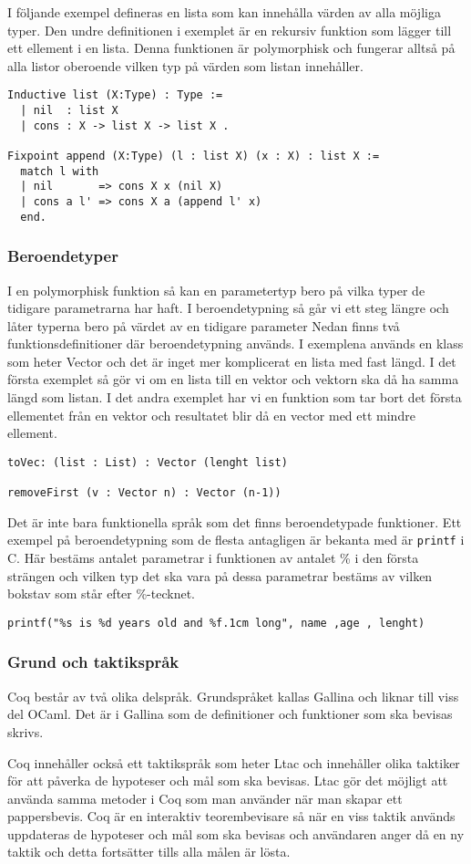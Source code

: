 I följande exempel defineras en lista som kan innehålla värden av alla möjliga
typer. Den undre definitionen i exemplet är en rekursiv funktion som lägger till
ett ellement i en lista. Denna funktionen är polymorphisk och fungerar alltså på
alla listor oberoende vilken typ på värden som listan innehåller.
\begin{lstlisting}
Inductive list (X:Type) : Type :=
  | nil  : list X
  | cons : X -> list X -> list X .

Fixpoint append (X:Type) (l : list X) (x : X) : list X :=
  match l with
  | nil       => cons X x (nil X)
  | cons a l' => cons X a (append l' x)
  end.
\end{lstlisting}

\subsubsection{Beroendetyper}
I en polymorphisk funktion så kan en parametertyp bero på vilka typer de
tidigare parametrarna har haft. I beroendetypning så går vi ett steg längre och
låter typerna bero på värdet av en tidigare parameter Nedan finns två
funktionsdefinitioner där beroendetypning används. I exemplena används en klass
som heter Vector och det är inget mer komplicerat en lista med fast längd. I
det första exemplet så gör vi om en lista till en vektor och vektorn ska då ha
samma längd som listan. I det andra exemplet har vi en funktion som tar bort
det första ellementet från en vektor och resultatet blir då en vector med ett
mindre ellement.
\begin{verbatim}
toVec: (list : List) : Vector (lenght list)

removeFirst (v : Vector n) : Vector (n-1))
\end{verbatim}
Det är inte bara funktionella språk som det finns beroendetypade funktioner.
Ett exempel på beroendetypning som de flesta antagligen är bekanta med är
\texttt{printf} i C. Här bestäms antalet parametrar i funktionen av antalet \%
i den första strängen och vilken typ det ska vara på dessa parametrar bestäms
av vilken bokstav som står efter \%-tecknet.
\begin{verbatim}
printf("%s is %d years old and %f.1cm long", name ,age , lenght)
\end{verbatim}


\subsubsection{Grund och taktikspråk}
Coq består av två olika delspråk. Grundspråket kallas Gallina och liknar till
viss del OCaml. Det är i Gallina som de definitioner och funktioner som ska
bevisas skrivs.

Coq innehåller också ett taktikspråk som heter Ltac och innehåller olika
taktiker för att påverka de hypoteser och mål som ska bevisas. Ltac gör det
möjligt att använda samma metoder i Coq som man använder när man skapar ett
pappersbevis. Coq är en interaktiv teorembevisare så när en viss taktik används
uppdateras de hypoteser och mål som ska bevisas och användaren anger då en ny
taktik och detta fortsätter tills alla målen är lösta.
